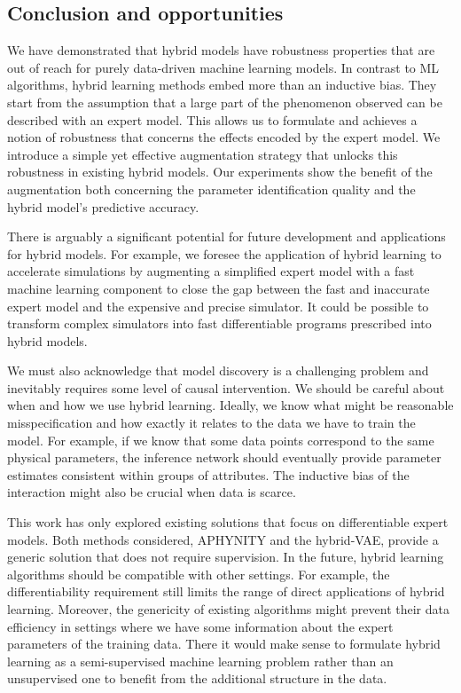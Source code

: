 \subsection{Conclusion and opportunities}
We have demonstrated that hybrid models have robustness properties that are out of reach for purely data-driven machine learning models. In contrast to ML algorithms, hybrid learning methods embed more than an inductive bias. They start from the assumption that a large part of the phenomenon observed can be described with an expert model. This allows us to formulate and achieves a notion of robustness that concerns the effects encoded by the expert model. We introduce a simple yet effective augmentation strategy that unlocks this robustness in existing hybrid models. Our experiments show the benefit of the augmentation both concerning the parameter identification quality and the hybrid model's predictive accuracy.

There is arguably a significant potential for future development and applications for hybrid models. For example, we foresee the application of hybrid learning to accelerate simulations by augmenting a simplified expert model with a fast machine learning component to close the gap between the fast and inaccurate expert model and the expensive and precise simulator. It could be possible to transform complex simulators into fast differentiable programs prescribed into hybrid models.

We must also acknowledge that model discovery is a challenging problem and inevitably requires some level of causal intervention. We should be careful about when and how we use hybrid learning. Ideally, we know what might be reasonable misspecification and how exactly it relates to the data we have to train the model. For example, if we know that some data points correspond to the same physical parameters, the inference network should eventually provide parameter estimates consistent within groups of attributes. The inductive bias of the interaction might also be crucial when data is scarce.

This work has only explored existing solutions that focus on differentiable expert models. Both methods considered, APHYNITY and the hybrid-VAE, provide a generic solution that does not require supervision. In the future, hybrid learning algorithms should be compatible with other settings. For example, the differentiability requirement still limits the range of direct applications of hybrid learning. Moreover, the genericity of existing algorithms might prevent their data efficiency in settings where we have some information about the expert parameters of the training data. There it would make sense to formulate hybrid learning as a semi-supervised machine learning problem rather than an unsupervised one to benefit from the additional structure in the data.

